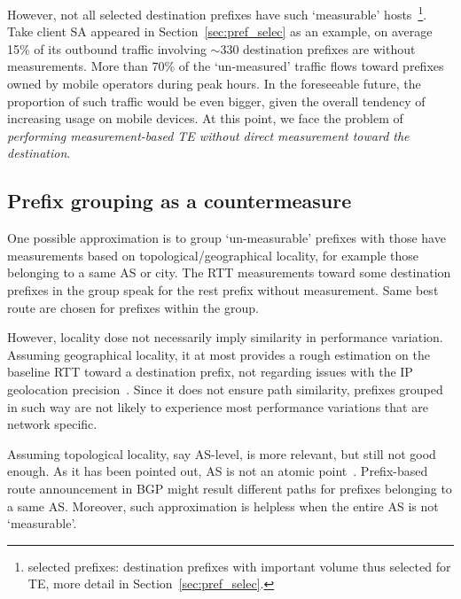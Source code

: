 However, not all selected destination prefixes have such `measurable' hosts~\footnote{selected prefixes: destination prefixes with important volume thus selected for TE, more detail in Section~\ref{sec:pref_selec}.}.
Take client SA appeared in Section~\ref{sec:pref_selec} as an example, on average 15\% of its outbound traffic involving $\sim 330$ destination prefixes are without measurements.
More than 70\% of the `un-measured' traffic flows toward prefixes owned by mobile operators during peak hours.
In the foreseeable future, the proportion of such traffic would be even bigger, given the overall tendency of increasing usage on mobile devices.
At this point, we face the problem of \textit{performing measurement-based TE without direct measurement toward the destination}. 

\subsection{Prefix grouping as a countermeasure}
One possible approximation is to group `un-measurable' prefixes with those have measurements based on topological/geographical locality, for example those belonging to a same AS or city. The RTT measurements toward some destination prefixes in the group speak for the rest prefix without measurement. Same best route are chosen for prefixes within the group.
 
However, locality dose not necessarily imply similarity in performance variation.
Assuming geographical locality, it at most provides a rough estimation on the baseline RTT toward a destination prefix, not regarding issues with the IP geolocation precision~\cite{Poese2011}. Since it does not ensure path similarity, prefixes grouped in such way are not likely to experience most performance variations that are network specific.

Assuming topological locality, say AS-level, is more relevant, but still not good enough.
As it has been pointed out, AS is not an atomic point~\cite{Muhlbauer2006}. Prefix-based route announcement in BGP might result different paths for prefixes belonging to a same AS. Moreover, such approximation is helpless when the entire AS is not `measurable'.

